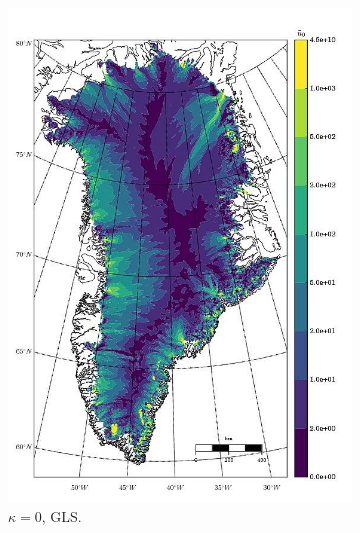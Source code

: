 
\begin{figure}
  
  \centering 

  \begin{subfigure}[b]{0.25\linewidth}
    \includegraphics[width=\linewidth]{images/balance_velocity/greenland/d_U_ob/Ubar_5H_kappa_0_GLS.jpg}
  \caption{$\kappa = 0$, GLS.}
  \label{greenland_bv_image_d_U_ob_kappa_0_GLS}
  \end{subfigure}
  \begin{subfigure}[b]{0.25\linewidth}

\end{subfigure}
\end{figure}
